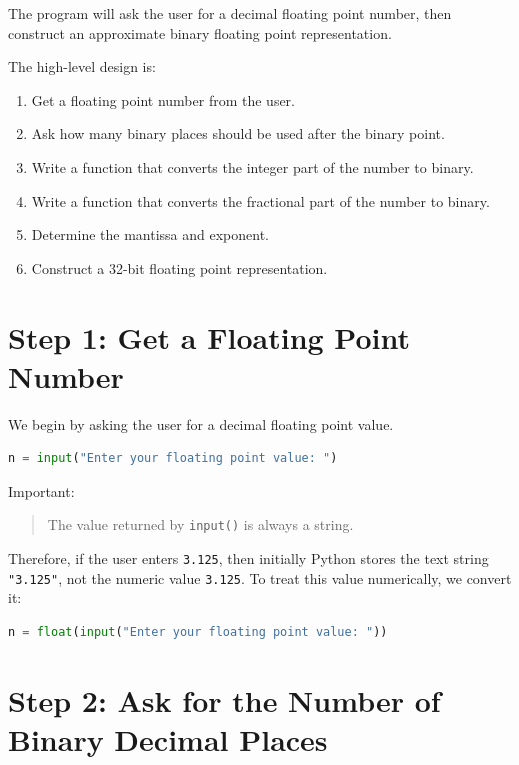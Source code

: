 \documentclass[11pt]{article}
\begin{document}
The program will ask the user for a decimal floating point number, then construct an approximate binary floating point representation.

The high-level design is:

\begin{enumerate}
    \item Get a floating point number from the user.
    \item Ask how many binary places should be used after the binary point.
    \item Write a function that converts the integer part of the number to binary.
    \item Write a function that converts the fractional part of the number to binary.
    \item Determine the mantissa and exponent.
    \item Construct a 32-bit floating point representation.
\end{enumerate}

\section{Step 1: Get a Floating Point Number}

We begin by asking the user for a decimal floating point value.

\begin{lstlisting}[language=Python]
n = input("Enter your floating point value: ")
\end{lstlisting}

Important:

\begin{quote}
The value returned by \texttt{input()} is always a string.
\end{quote}

Therefore, if the user enters \texttt{3.125}, then initially Python stores the text string \texttt{"3.125"}, not the numeric value \texttt{3.125}. To treat this value numerically, we convert it:

\begin{lstlisting}[language=Python]
n = float(input("Enter your floating point value: "))
\end{lstlisting}

\section{Step 2: Ask for the Number of Binary Decimal Places}
\end{document}
